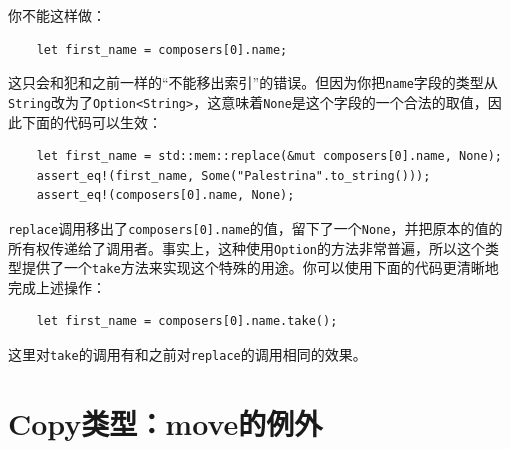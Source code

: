 你不能这样做：
\begin{verbatim}
    let first_name = composers[0].name;
\end{verbatim}

这只会和犯和之前一样的“不能移出索引”的错误。但因为你把\texttt{name}字段的类型从\texttt{String}改为了\texttt{Option<String>}，这意味着\texttt{None}是这个字段的一个合法的取值，因此下面的代码可以生效：
\begin{verbatim}
    let first_name = std::mem::replace(&mut composers[0].name, None);
    assert_eq!(first_name, Some("Palestrina".to_string()));
    assert_eq!(composers[0].name, None);
\end{verbatim}

\texttt{replace}调用移出了\texttt{composers[0].name}的值，留下了一个\texttt{None}，并把原本的值的所有权传递给了调用者。事实上，这种使用\texttt{Option}的方法非常普遍，所以这个类型提供了一个\texttt{take}方法来实现这个特殊的用途。你可以使用下面的代码更清晰地完成上述操作：
\begin{verbatim}
    let first_name = composers[0].name.take();
\end{verbatim}
这里对\texttt{take}的调用有和之前对\texttt{replace}的调用相同的效果。

\section{Copy类型：move的例外}















